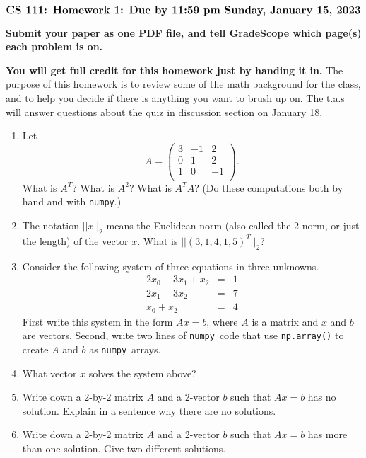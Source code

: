 \documentclass[11pt]{article}
\newcommand{\numpy}{{\tt numpy}}            %
\begin{document}
$$\mbox{\Large \bf CS 111: Homework 1: Due by 11:59 pm Sunday, January 15, 2023}$$
\par\smallskip\noindent
{\bf Submit your paper as one PDF file,
and tell GradeScope which page(s) each problem is on.}

\par\medskip\noindent
{\bf You will get full credit for this homework just by handing it in.}
The purpose of this homework is to review some of the math background
for the class, and to help you decide if there is anything you want to 
brush up on.  The t.a.s will answer questions about the quiz in discussion 
section on January 18.


\begin{enumerate}

\item
Let
$$ A = \left(
\begin{array}{ccc}
3 & -1 & 2 \\ 	
0 & 1 & 2 \\ 
1 & 0 & -1 \\
\end{array} 
\right). $$
What is $A^T$?  What is $A^2$?  What is $A^TA$?
(Do these computations both by hand and with \numpy.)

\item
The notation $||x||_2$ means the Euclidean norm (also called the 2-norm,
or just the length) of the vector $x$.  
What is $||(3, 1, 4, 1, 5)^T||_2$?

\item
Consider the following system of three equations in three unknowns.
\begin{eqnarray}
 2x_0 - 3x_1 + x_2  & =  & 1 \\
 2x_1 + 3x_2  & =  & 7 \\
 x_0 + x_2  & = & 4 
\end{eqnarray}
First write this system in the form $Ax=b$, 
where $A$ is a matrix and $x$ and $b$ are vectors. 
Second, write two lines of \numpy\ code that use {\tt np.array()} to
create $A$ and $b$ as \numpy\ arrays.

\item
What vector $x$ solves the system above? 

\item
Write down a 2-by-2 matrix $A$ and a 2-vector $b$ such that $Ax=b$ has no 
solution.  Explain in a sentence why there are no solutions.

\item
Write down a 2-by-2 matrix $A$ and a 2-vector $b$ such that $Ax=b$ has 
more than one solution.  Give two different solutions.


\end{enumerate}
\end{document}
